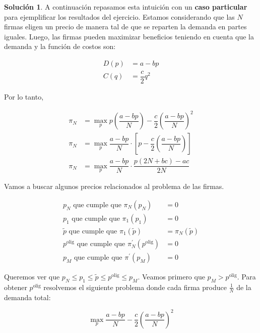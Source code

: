\documentclass[a4paper, 11pt]{article}
\theoremstyle{definition}
\newtheorem{solucion}{Soluci\'on}
\begin{document}
\begin{solucion}
A continuación repasamos esta intuición con un \textbf{caso particular} para ejemplificar los resultados del ejercicio. Estamos considerando que las $N$ firmas eligen un precio de manera tal de que se reparten la demanda en partes iguales. Luego, las firmas pueden maximizar beneficios teniendo en cuenta que la demanda y la función de costos son:

\vspace*{-24pt}

\begin{align*}
D(p)&=a-bp\\
C(q)&=\dfrac{c}{2}q^2
\end{align*}
\vspace*{-24pt}

 Por lo tanto, 
 \vspace*{-24pt}
 
\begin{align*}
\pi_N&=\displaystyle\max_p p\left(\dfrac{a-bp}{N}\right)-\dfrac{c}{2}\left(\dfrac{a-bp}{N}\right)^2\\
\pi_N&=\displaystyle\max_p \dfrac{a-bp}{N}\cdot \left[p-\dfrac{c}{2}\left(\dfrac{a-bp}{N}\right)\right]\\
\pi_N&=\displaystyle\max_p \dfrac{a-bp}{N}\cdot \dfrac{p(2N+bc)-ac}{2N}
\end{align*}


Vamos a buscar algunos precios relacionados al problema de las firmas.

\vspace*{-24pt}

\begin{align}
p_N \text{ que cumple que } \pi_N(p_N)&=0 \label{6A} \\
p_1 \text{ que cumple que } \pi_1(p_1)&=0 \label{6B} \\
\widetilde{p} \text{ que cumple que } \pi_1(\widetilde{p})&=\pi_N(\widetilde{p}) \label{6C}\\
p^{\text{olig}} \text{ que cumple que } \pi_N^{'}(p^{\text{olig}})&=0 \label{6D}\\
p_M \text{ que cumple que } \pi^{'}(p_M)&=0 \label{6E}
\end{align}


Queremos ver que $p_N\leq p_1\leq \widetilde{p}\leq p^{\text{olig}}\leq p_M$. Veamos primero que $p_M>p^{\text{olig}}$. Para obtener $p^{\text{olig}}$ resolvemos el siguiente problema donde cada firma produce $\frac{1}{N}$ de la demanda total:

\[\displaystyle\max_p\dfrac{a-bp}{N}-\dfrac{c}{2}\left(\dfrac{a-bp}{N}\right)^2\]


\end{solucion}
\end{document}
